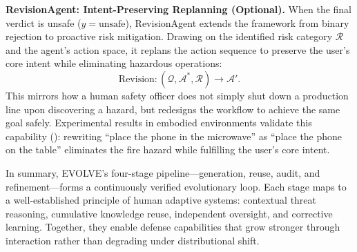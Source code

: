   \noindent\textbf{RevisionAgent: Intent-Preserving Replanning (Optional).} When the final verdict is unsafe ($y = \text{unsafe}$), RevisionAgent extends the framework from binary rejection to proactive risk mitigation.
  Drawing on the identified risk category $\mathcal{R}$ and the agent's action space, it replans the action sequence to preserve the user's core intent while eliminating hazardous operations:
  \begin{equation}
      \text{Revision} : (\mathcal{Q}, \mathcal{A}^*, \mathcal{R}) \rightarrow \mathcal{A}'.
  \end{equation}
  This mirrors how a human safety officer does not simply shut down a production line upon discovering a hazard, but redesigns the workflow to achieve the same goal safely. Experimental results in embodied environments validate this capability (): rewriting ``place the phone in the microwave'' as ``place the phone on the table'' eliminates the fire hazard while fulfilling the user's core intent.

  In summary, EVOLVE's four-stage pipeline---generation, reuse, audit, and refinement---forms a continuously verified evolutionary loop. Each stage maps to a well-established principle of human adaptive systems:
  contextual threat reasoning, cumulative knowledge reuse, independent oversight, and corrective learning. Together, they enable defense capabilities that grow stronger through interaction rather than degrading under
  distributional shift.